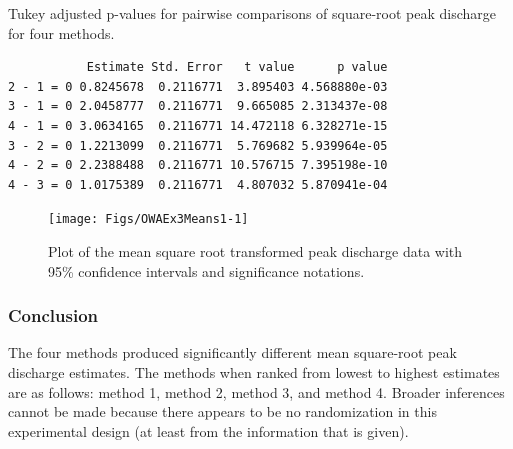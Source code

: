\documentclass[10pt,openany]{book}\usepackage[]{graphicx}\usepackage[]{color}
\makeatletter
\newenvironment{kframe}{%
 \def\at@end@of@kframe{}%
 \ifinner\ifhmode%
  \def\at@end@of@kframe{\end{minipage}}%
  \begin{minipage}{\columnwidth}%
 \fi\fi%
 \def\FrameCommand##1{\hskip\@totalleftmargin \hskip-\fboxsep
 \colorbox{shadecolor}{##1}\hskip-\fboxsep
     \hskip-\linewidth \hskip-\@totalleftmargin \hskip\columnwidth}%
 \MakeFramed {\advance\hsize-\width
   \@totalleftmargin\z@ \linewidth\hsize
   \@setminipage}}%
 {\par\unskip\endMakeFramed%
 \at@end@of@kframe}
\newenvironment{knitrout}{}{} %
\makeatother
\begin{document}
\begin{table}[h]
  \centering
  \caption{Tukey adjusted p-values for pairwise comparisons of square-root peak discharge for four methods.}\label{tab:OWAEx3Results2}
\begin{knitrout}
\color{fgcolor}\begin{kframe}
\begin{verbatim}
           Estimate Std. Error   t value      p value
2 - 1 = 0 0.8245678  0.2116771  3.895403 4.568880e-03
3 - 1 = 0 2.0458777  0.2116771  9.665085 2.313437e-08
4 - 1 = 0 3.0634165  0.2116771 14.472118 6.328271e-15
3 - 2 = 0 1.2213099  0.2116771  5.769682 5.939964e-05
4 - 2 = 0 2.2388488  0.2116771 10.576715 7.395198e-10
4 - 3 = 0 1.0175389  0.2116771  4.807032 5.870941e-04
\end{verbatim}
\end{kframe}
\end{knitrout}
\end{table}

\begin{knitrout}
\color{fgcolor}\begin{figure}[hbtp]

{\centering \texttt{[image: Figs/OWAEx3Means1-1]} 

}

\caption[Plot of the mean square root transformed peak discharge data with 95\% confidence intervals and significance notations]{Plot of the mean square root transformed peak discharge data with 95\% confidence intervals and significance notations.}\label{fig:OWAEx3Means1}
\end{figure}


\end{knitrout}

\subsubsection*{Conclusion}
The four methods produced significantly different mean square-root peak discharge estimates.  The methods when ranked from lowest to highest estimates are as follows: method 1, method 2, method 3, and method 4.  Broader inferences cannot be made because there appears to be no randomization in this experimental design (at least from the information that is given).

\newpage
\end{document}
